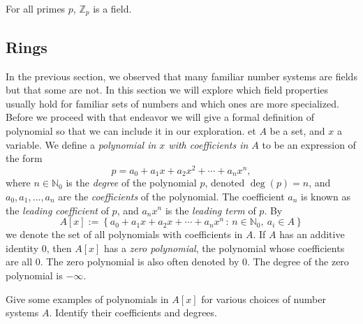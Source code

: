 \documentclass[english,course]{lecture}
\theoremstyle{plain}
\newenvironment{definition}[1]
  {\renewcommand\theinnerdefinition{#1}\innerdefinition}
  {\endinnerdefinition}
\def\setof#1#2{{\left\{#1\,\colon\,#2\right\}}}
\def\Z{{\mathbb Z}}
\def\N{{\mathbb N}}
\def\presnotes{}
\begin{document}
\begin{theorem}
	For all primes $p$, $\Z_p$ is a field.
\end{theorem}

\presnotes


\subsection{Rings}\label{SubSec-Rings}
In the previous section, we observed that many familiar number systems are fields but that some are not. In this section we will explore which field properties usually hold for familiar sets of numbers and which ones are more specialized. Before we proceed with that endeavor we will give a formal definition of polynomial so that we can include it in our exploration.
\begin{definition}
	Let $A$ be a set, and $x$ a variable.
	We define a \emph{polynomial in $x$ with coefficients in $A$} to be an expression of the form
	\[
		p = a_0 + a_1 x + a_2 x^2 + \cdots + a_n x^n,
	\]
	where $n\in \N_0$ is the \emph{degree} of the polynomial $p$, denoted $\deg(p) = n$, and $a_0,a_1,\ldots, a_n$ are the \emph{coefficients} of the polynomial.
	The coefficient $a_n$ is known as the \emph{leading coefficient} of $p$, and $a_n x^n$ is the \emph{leading term} of $p$.
	By
	\[
		A[x] := \setof{a_0 + a_1 x + a_2 x + \cdots + a_n x^n}{n\in \N_0, \ a_i\in A}
	\]
	we denote the set of all polynomials with coefficients in $A$.
	If $A$ has an additive identity $0$, then $A[x]$ has a \emph{zero polynomial}, the polynomial whose coefficients are all $0$.
	The zero polynomial is also often denoted by $0$.
	The degree of the zero polynomial is $-\infty$.
\end{definition}

\begin{exer}
	Give some examples of polynomials in $A[x]$ for various choices of number systems $A$.
	Identify their coefficients and degrees.
\end{exer}

\presnotes
\end{document}
